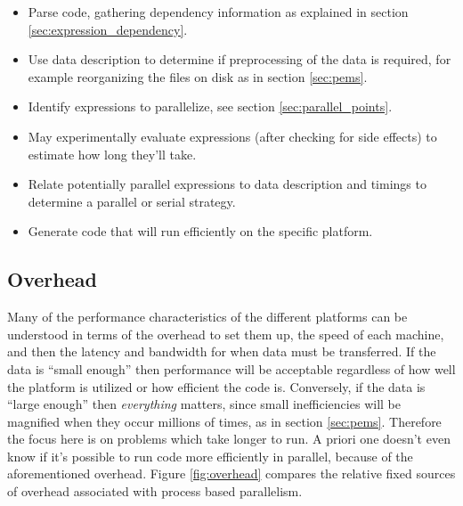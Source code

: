\documentclass[12pt]{article}
\begin{document}
\begin{itemize}
    \item Parse code, gathering dependency information as explained in
        section \ref{sec:expression_dependency}.

    \item Use data description to determine if preprocessing of the data is required, for example
        reorganizing the files on disk as in section \ref{sec:pems}.
    \item Identify expressions to parallelize, see section
        \ref{sec:parallel_points}.
    \item May experimentally evaluate expressions (after checking for side
        effects) to estimate how long they'll take.
    \item Relate potentially parallel expressions to data description and timings
        to determine a parallel or serial strategy.
    \item Generate code that will run efficiently on the specific platform.
\end{itemize}

\subsection{Overhead}

Many of the performance characteristics of the different platforms can be
understood in terms of the overhead to set them up, the speed of each
machine, and then the latency and bandwidth for when data must be
transferred.  If the data is ``small enough'' then performance will be
acceptable regardless of how well the platform is utilized or how efficient
the code is. Conversely, if the data is ``large enough'' then
\emph{everything} matters, since small inefficiencies will be magnified
when they occur millions of times, as in section \ref{sec:pems}.  Therefore
the focus here is on problems which take longer to run. A priori one
doesn't even know if it's possible to run code more efficiently in
parallel, because of the aforementioned overhead.
Figure \ref{fig:overhead} compares the relative fixed sources of overhead
associated with process based parallelism.
\end{document}
